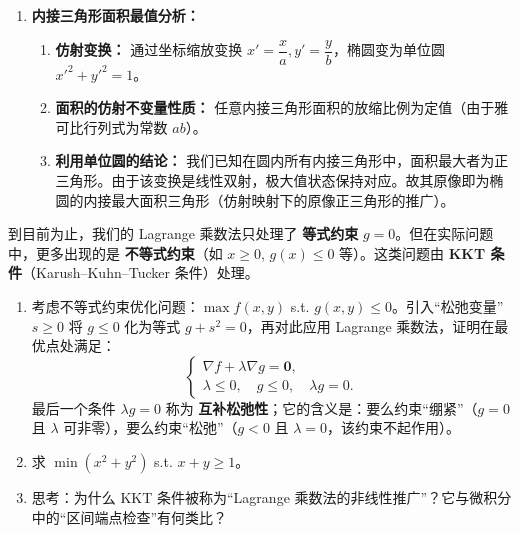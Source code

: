 \documentclass[lang=cn,11pt]{elegantbook}
\begin{document}
\begin{solution}
\begin{enumerate}
  \item[(3)] \textbf{内接三角形面积最值分析：}
  \begin{enumerate}
    \item \textbf{仿射变换：}
    通过坐标缩放变换 $x'=\dfrac{x}{a}, y'=\dfrac{y}{b}$，椭圆变为单位圆 $x'^2+y'^2=1$。
    \item \textbf{面积的仿射不变量性质：}
    任意内接三角形面积的放缩比例为定值（由于雅可比行列式为常数 $ab$）。
    \item \textbf{利用单位圆的结论：}
    我们已知在圆内所有内接三角形中，面积最大者为正三角形。由于该变换是线性双射，极大值状态保持对应。故其原像即为椭圆的内接最大面积三角形（仿射映射下的原像正三角形的推广）。
  \end{enumerate}
\end{enumerate}
\end{solution}

\begin{exercise}
到目前为止，我们的 Lagrange 乘数法只处理了 \textbf{等式约束} $g=0$。但在实际问题中，更多出现的是 \textbf{不等式约束}（如 $x\geq 0$, $g(x)\leq 0$ 等）。这类问题由 \textbf{KKT 条件}（Karush--Kuhn--Tucker 条件）处理。
\begin{enumerate}
  \item[(1)] 考虑不等式约束优化问题：$\max f(x,y)$ s.t. $g(x,y)\leq 0$。引入“松弛变量”$s\geq 0$ 将 $g\leq 0$ 化为等式 $g+s^2=0$，再对此应用 Lagrange 乘数法，证明在最优点处满足：
        \[
        \begin{cases}
          \nabla f+\lambda\nabla g=\boldsymbol 0,\\
          \lambda\leq 0,\quad g\leq 0,\quad \lambda g=0.
        \end{cases}
        \]
        最后一个条件 $\lambda g=0$ 称为 \textbf{互补松弛性}；它的含义是：要么约束“绷紧”（$g=0$ 且 $\lambda$ 可非零），要么约束“松弛”（$g<0$ 且 $\lambda=0$，该约束不起作用）。
  \item[(2)] 求 $\min(x^2+y^2)$ s.t. $x+y\geq 1$。
  \item[(3)] 思考：为什么 KKT 条件被称为“Lagrange 乘数法的非线性推广”？它与微积分中的“区间端点检查”有何类比？
\end{enumerate}
\end{exercise}
\end{document}
